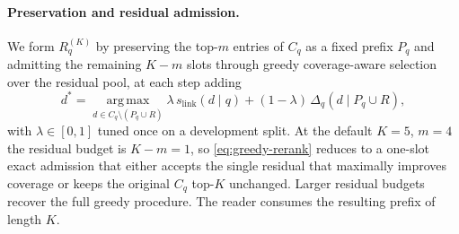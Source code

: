 \paragraph{Preservation and residual admission.}
We form $R_q^{(K)}$ by preserving the top-$m$ entries of $C_q$ as
a fixed prefix $P_q$ and admitting the remaining $K-m$ slots
through greedy coverage-aware selection
\citep{carbonell1998mmr,lin2011submodular} over the residual pool,
at each step adding
\begin{equation}
\label{eq:greedy-rerank}
d^{*}
=
\operatorname*{arg\,max}_{d \in C_q \setminus (P_q \cup R)}
\lambda\,s_{\mathrm{link}}(d \mid q)
+
(1-\lambda)\,\Delta_q(d \mid P_q \cup R),
\end{equation}
with $\lambda\in[0,1]$ tuned once on a development split. At the
default $K=5$, $m=4$ the residual budget is $K-m=1$, so
\eqref{eq:greedy-rerank} reduces to a one-slot exact admission
that either accepts the single residual that maximally improves
coverage or keeps the original $C_q$ top-$K$ unchanged. Larger
residual budgets recover the full greedy procedure.
The reader consumes the resulting prefix of length $K$.
